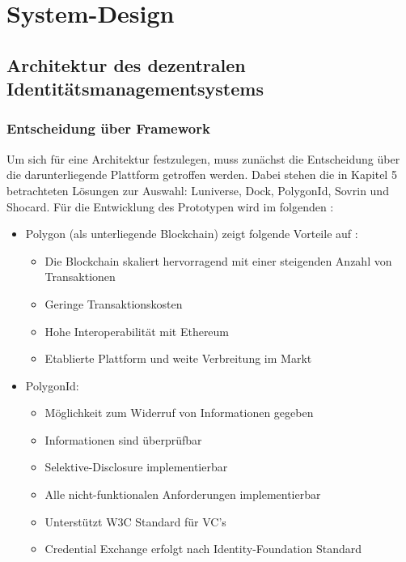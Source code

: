 \chapter{System-Design}
\label{cha:systemdesign}

\section{Architektur des dezentralen Identitätsmanagementsystems}

\subsection{Entscheidung über Framework}
Um sich für eine Architektur festzulegen, muss zunächst die Entscheidung über die darunterliegende Plattform getroffen werden. Dabei stehen die in Kapitel 5 betrachteten Lösungen zur Auswahl: Luniverse, Dock, PolygonId, Sovrin und Shocard. Für die Entwicklung des Prototypen wird im folgenden :
\begin{itemize}
	
	\item Polygon (als unterliegende Blockchain) zeigt folgende Vorteile auf \cite{ID54}:
	\begin{itemize}
		\item Die Blockchain skaliert hervorragend mit einer steigenden Anzahl von Transaktionen
		\item Geringe Transaktionskosten
		\item Hohe Interoperabilität mit Ethereum
		\item Etablierte Plattform und weite Verbreitung im Markt
	\end{itemize}
	
	\item PolygonId:
	\begin{itemize}
		\item Möglichkeit zum Widerruf von Informationen gegeben
		\item Informationen sind überprüfbar
		\item Selektive-Disclosure implementierbar
		\item Alle nicht-funktionalen Anforderungen implementierbar
		\item Unterstützt W3C Standard für VC's
		\item Credential Exchange erfolgt nach Identity-Foundation Standard
	\end{itemize}
\end{itemize}
